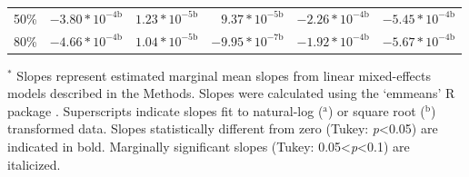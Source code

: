 \begin{landscape}
\begin{table}
{\begin{tabular}{p{2cm}p{3.2cm}p{3.2cm}p{3.2cm}p{3.2cm}p{3.2cm}}
            \multicolumn{1}{r}{50\%}
            &  \multicolumn{1}{r}{\textbf{$-3.80*10^{-4\mathrm{b}}$}}
            &  \multicolumn{1}{r}{\textbf{$1.23*10^{-5\mathrm{b}}$}}
            &  \multicolumn{1}{r}{\textbf{$9.37*10^{-5\mathrm{b}}$}}
            &  \multicolumn{1}{r}{\textbf{$-2.26*10^{-4\mathrm{b}}$}}
            &  \multicolumn{1}{r}{\textbf{$-5.45*10^{-4\mathrm{b}}$}}
            \\
              
            \multicolumn{1}{r}{80\%}
            &  \multicolumn{1}{r}{\textbf{$-4.66*10^{-4\mathrm{b}}$}}
            &  \multicolumn{1}{r}{\textbf{$1.04*10^{-5\mathrm{b}}$}}
            &  \multicolumn{1}{r}{$-9.95*10^{-7\mathrm{b}}$}
            &  \multicolumn{1}{r}{\textbf{$-1.92*10^{-4\mathrm{b}}$}}
            &  \multicolumn{1}{r}{\textbf{$-5.67*10^{-4\mathrm{b}}$}}
            \\
            \hline
        \end{tabular}}
        \label{tab:table2.3}
    \end{table}
\begin{singlespace}
    \noindent $^*$ Slopes represent estimated marginal mean slopes from linear mixed-effects models described in the Methods. Slopes were calculated using the ‘emmeans’ R package . Superscripts indicate slopes fit to natural-log ($^\mathrm{a}$) or square root ($^\mathrm{b}$) transformed data. Slopes statistically different from zero (Tukey: \textit{p}<0.05) are indicated in bold. Marginally significant slopes (Tukey: 0.05<\textit{p}<0.1) are italicized.
\end{singlespace}
\end{landscape}
\clearpage

